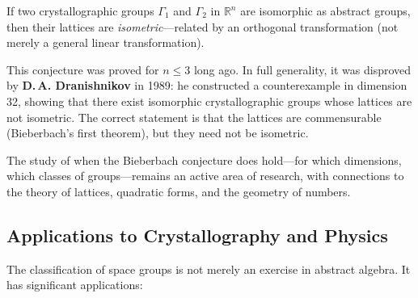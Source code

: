 \begin{conjecture}\label{conj:bieberbach}
If two crystallographic groups $\Gamma_1$ and $\Gamma_2$ in $\mathbb{R}^n$ are isomorphic as abstract groups, then their lattices are \emph{isometric}---related by an orthogonal transformation (not merely a general linear transformation).
\end{conjecture}

This conjecture was proved for $n \leq 3$ long ago. In full generality, it was disproved by \textbf{D.\,A. Dranishnikov} in 1989: he constructed a counterexample in dimension 32, showing that there exist isomorphic crystallographic groups whose lattices are not isometric. The correct statement is that the lattices are commensurable (Bieberbach's first theorem), but they need not be isometric.

The study of when the Bieberbach conjecture does hold---for which dimensions, which classes of groups---remains an active area of research, with connections to the theory of lattices, quadratic forms, and the geometry of numbers.

\subsection{Applications to Crystallography and Physics}

The classification of space groups is not merely an exercise in abstract algebra. It has significant applications:

